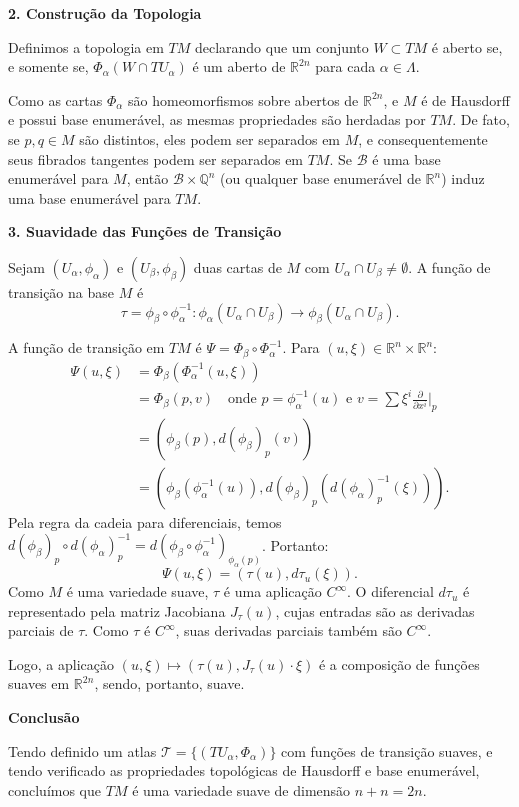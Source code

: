 {	\textbf{2. Construção da Topologia}
	
	Definimos a topologia em $TM$ declarando que um conjunto $W \subset TM$ é aberto se, e somente se, $\Phi_\alpha(W \cap T U_\alpha)$ é um aberto de $\mathbb{R}^{2n}$ para cada $\alpha \in \Lambda$. 
	
	Como as cartas $\Phi_\alpha$ são homeomorfismos sobre abertos de $\mathbb{R}^{2n}$, e $M$ é de Hausdorff e possui base enumerável, as mesmas propriedades são herdadas por $TM$. De fato, se $p, q \in M$ são distintos, eles podem ser separados em $M$, e consequentemente seus fibrados tangentes podem ser separados em $TM$. Se $\mathcal{B}$ é uma base enumerável para $M$, então $\mathcal{B} \times \mathbb{Q}^n$ (ou qualquer base enumerável de $\mathbb{R}^n$) induz uma base enumerável para $TM$.
	
	\textbf{3. Suavidade das Funções de Transição}
	
	Sejam $(U_\alpha, \phi_\alpha)$ e $(U_\beta, \phi_\beta)$ duas cartas de $M$ com $U_\alpha \cap U_\beta \neq \emptyset$. A função de transição na base $M$ é $$\tau = \phi_\beta \circ \phi_\alpha^{-1} : \phi_\alpha(U_\alpha \cap U_\beta) \to \phi_\beta(U_\alpha \cap U_\beta).$$
	
	A função de transição em $TM$ é $\Psi = \Phi_\beta \circ \Phi_\alpha^{-1}$. Para $(u, \xi) \in \mathbb{R}^n \times \mathbb{R}^n$:
	\begin{align*}
		\Psi(u, \xi) &= \Phi_\beta(\Phi_\alpha^{-1}(u, \xi)) \\
		&= \Phi_\beta(p, v) \quad \text{onde } p = \phi_\alpha^{-1}(u) \text{ e } v = \sum \xi^i \frac{\partial}{\partial x^i} \Big|_p \\
		&= (\phi_\beta(p), d(\phi_\beta)_p(v)) \\
		&= (\phi_\beta(\phi_\alpha^{-1}(u)), d(\phi_\beta)_p(d(\phi_\alpha)^{-1}_p(\xi))).
	\end{align*}
	Pela regra da cadeia para diferenciais, temos $d(\phi_\beta)_p \circ d(\phi_\alpha)^{-1}_p = d(\phi_\beta \circ \phi_\alpha^{-1})_{\phi_\alpha(p)}$. Portanto:
	\begin{equation*}
		\Psi(u, \xi) = (\tau(u), d\tau_u(\xi)).
	\end{equation*}
	Como $M$ é uma variedade suave, $\tau$ é uma aplicação $C^\infty$. O diferencial $d\tau_u$ é representado pela matriz Jacobiana $J_\tau(u)$, cujas entradas são as derivadas parciais de $\tau$. Como $\tau$ é $C^\infty$, suas derivadas parciais também são $C^\infty$. 
	
	Logo, a aplicação $(u, \xi) \mapsto (\tau(u), J_\tau(u) \cdot \xi)$ é a composição de funções suaves em $\mathbb{R}^{2n}$, sendo, portanto, suave.
	
	\textbf{Conclusão}
	
	Tendo definido um atlas $\mathcal{T} = \{(T U_\alpha, \Phi_\alpha)\}$ com funções de transição suaves, e tendo verificado as propriedades topológicas de Hausdorff e base enumerável, concluímos que $TM$ é uma variedade suave de dimensão $n + n = 2n$.
}
